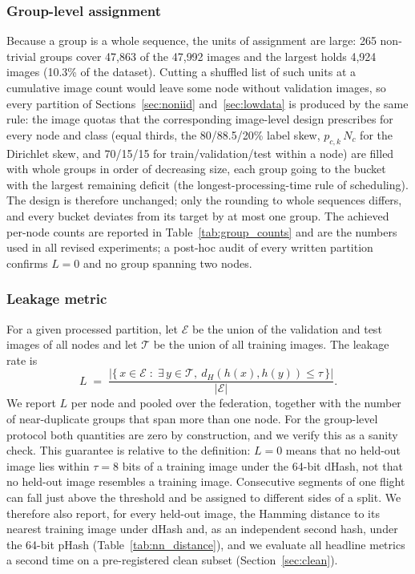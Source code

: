 \documentclass[journal]{IEEEtran}
\begin{document}
\subsubsection{Group-level assignment}
Because a group is a whole sequence, the units of assignment are large: 265 non-trivial groups cover 47{,}863 of the 47{,}992 images and the largest holds 4{,}924 images (10.3\% of the dataset). Cutting a shuffled list of such units at a cumulative image count would leave some node without validation images, so every partition of Sections~\ref{sec:noniid} and~\ref{sec:lowdata} is produced by the same rule: the image quotas that the corresponding image-level design prescribes for every node and class (equal thirds, the 80/88.5/20\% label skew, $p_{c,k}\,N_c$ for the Dirichlet skew, and 70/15/15 for train/validation/test within a node) are filled with whole groups in order of decreasing size, each group going to the bucket with the largest remaining deficit (the longest-processing-time rule of scheduling). The design is therefore unchanged; only the rounding to whole sequences differs, and every bucket deviates from its target by at most one group. The achieved per-node counts are reported in Table~\ref{tab:group_counts} and are the numbers used in all revised experiments; a post-hoc audit of every written partition confirms $L=0$ and no group spanning two nodes.

\subsubsection{Leakage metric}
For a given processed partition, let $\mathcal{E}$ be the union of the validation and test images of all nodes and let $\mathcal{T}$ be the union of all training images. The leakage rate is
\begin{equation}
L \;=\; \frac{\bigl|\{\, x \in \mathcal{E} \;:\; \exists\, y \in \mathcal{T},\ d_H(h(x),h(y)) \le \tau \,\}\bigr|}{|\mathcal{E}|}.
\label{eq:leak}
\end{equation}
We report $L$ per node and pooled over the federation, together with the number of near-duplicate groups that span more than one node. For the group-level protocol both quantities are zero by construction, and we verify this as a sanity check. This guarantee is relative to the definition: $L=0$ means that no held-out image lies within $\tau=8$ bits of a training image under the 64-bit dHash, not that no held-out image resembles a training image. Consecutive segments of one flight can fall just above the threshold and be assigned to different sides of a split. We therefore also report, for every held-out image, the Hamming distance to its nearest training image under dHash and, as an independent second hash, under the 64-bit pHash (Table~\ref{tab:nn_distance}), and we evaluate all headline metrics a second time on a pre-registered clean subset (Section~\ref{sec:clean}).
\end{document}
